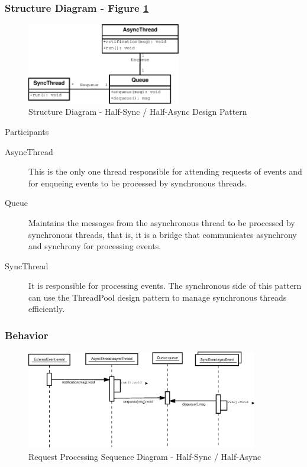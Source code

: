 \subsubsection{Structure Diagram - Figure \ref{fig:str_diagram_hfha}}

\begin{figure}
	\centering
	\includegraphics*[width=0.6\textwidth, keepaspectratio=false]{fig/image19.eps}
	\caption{Structure Diagram - Half-Sync / Half-Async Design Pattern}
	\label{fig:str_diagram_hfha}
\end{figure}

\begin{description}
	\item[Participants]
\end{description}

\begin{description}
	
	\item[AsyncThread]
	This is the only one thread responsible for attending requests of events and for enqueing events to be processed by synchronous threads.
	
	\item[Queue]
	Maintains the messages from the asynchronous thread to be processed by synchronous threads, that is, it is a bridge that communicates asynchrony and synchrony for processing events.
	
	\item[SyncThread]
	It is responsible for processing events. The synchronous side of this pattern can use the ThreadPool design pattern to manage synchronous threads efficiently.
	
\end{description}

\subsubsection{Behavior}

\begin{figure}
	\centering
	\includegraphics*[width=0.9\textwidth, keepaspectratio=false]{fig/image20.eps}
	\caption{Request Processing Sequence Diagram - Half-Sync / Half-Async}
	\label{fig:seq_diagram_hfha}
\end{figure}

